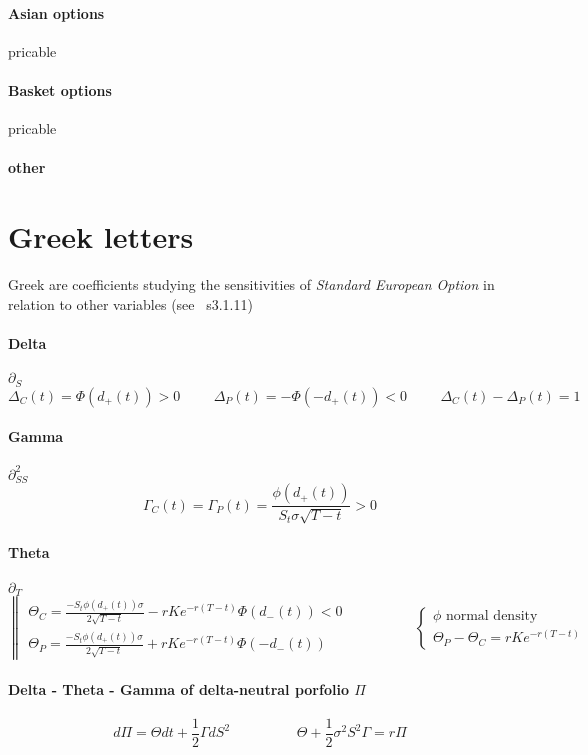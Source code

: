 \documentclass[a4paper,10pt]{article}
\begin{document}
\paragraph{Asian options} pricable
\paragraph{Basket options} pricable
\paragraph{other}

\section{Greek letters}
Greek are coefficients studying the sensitivities of \textit{Standard European Option} in relation to other variables (see~\cite{MAREK} s3.1.11)
\paragraph{Delta} $\partial_{S}$
\[
\Delta_C(t) = \Phi(d_+(t))>0
\hspace{1cm}
\Delta_P(t) = -\Phi(-d_+(t))<0
\hspace{1cm}
\Delta_C(t) - \Delta_P(t) = 1
\]
\paragraph{Gamma} $\partial^2_{SS}$
\[
\Gamma_C(t) = \Gamma_P(t) = \frac{\phi(d_+(t)) }{S_t \sigma \sqrt{T-t}} >0
\]
\paragraph{Theta} $\partial_{T}$
\[
\left\| 
\begin{array}{l}
\Theta_C = \frac{-S_t \phi(d_+(t)) \sigma}{2\sqrt{T-t}} - rKe^{-r(T-t)} \Phi(d_-(t))  <0 \\
\Theta_P = \frac{-S_t \phi(d_+(t)) \sigma}{2\sqrt{T-t}} + rKe^{-r(T-t)} \Phi(-d_-(t)) 
\end{array}\right. 
\hspace{2cm}
\left\{ 
\begin{array}{l}
\phi \text{ normal density} \\
\Theta_P - \Theta_C = rKe^{-r(T-t)}
\end{array}\right. 
\]
\paragraph{Delta - Theta - Gamma of delta-neutral porfolio $\Pi$}
\[
d\Pi = \Theta dt + \frac{1}{2} \Gamma dS^2
\hspace{2cm}
\Theta + \frac{1}{2}\sigma^2 S^2 \Gamma = r\Pi
\]
\end{document}
